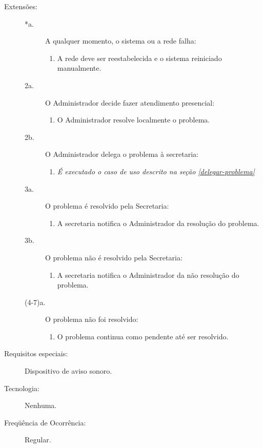 \documentclass[brazil,times]{abnt}
\begin{document}
\begin{description}
\item[Extensões:]\hfill
\begin{description}
	\item[*a.] A qualquer momento, o sistema ou a rede falha: \hfill
	\begin{enumerate}
 		\item A rede deve ser reestabelecida e o sistema
 		reiniciado manualmente.
	\end{enumerate} 

	\item[2a.] O Administrador decide fazer atendimento presencial:
	\begin{enumerate}
  		\item O Administrador resolve localmente o problema.
	\end{enumerate}

	\item[2b.] O Administrador delega o problema à secretaria:
	\begin{enumerate}
  		\item \em{É executado o caso de uso descrito na seção
  		\ref{delegar-problema}}
	\end{enumerate}

	\item[3a.] O problema é resolvido pela Secretaria:
	\begin{enumerate}
  		\item A secretaria notifica o Administrador da resolução do problema.
	\end{enumerate}

	\item[3b.] O problema não é resolvido pela Secretaria:
	\begin{enumerate}
  		\item A secretaria notifica o Administrador da não resolução do problema.
	\end{enumerate}

	\item[(4-7)a.] O problema não foi resolvido:
	\begin{enumerate}
  		\item O problema continua como pendente até ser resolvido.
	\end{enumerate}
\end{description}

\item[Requisitos especiais:] Dispositivo de aviso sonoro.
\item[Tecnologia:] Nenhuma.
\item[Freqüência de Ocorrência:] Regular.


\end{description}
\end{document}
